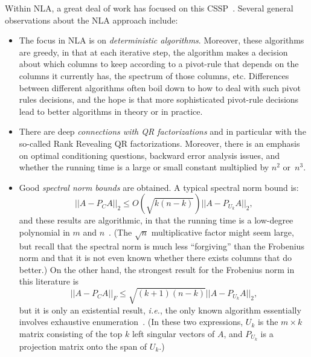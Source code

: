 \documentclass[twoside]{article}
\begin{document}
Within NLA, a great deal of work has focused on this 
CSSP~\cite{BG65,Fos86,Cha87,CH90,BH91,HP92,CI94,GE96,BQ98a,PT99,Pan00}.
Several general observations about the NLA approach include:
\begin{itemize}
\item
The focus in NLA is on \emph{deterministic algorithms}.
Moreover, these algorithms are greedy, in that at each iterative step, the 
algorithm makes a decision about which columns to keep according to a 
pivot-rule that depends on the columns it currently has, the spectrum of 
those columns, etc.
Differences between different algorithms often boil down to how to deal with 
such pivot rules decisions, and the hope is that more sophisticated 
pivot-rule decisions lead to better algorithms in theory or in practice.
\item
There are deep \emph{connections with QR factorizations} and in particular 
with the so-called Rank Revealing QR factorizations.
Moreover, there is an emphasis on optimal conditioning questions, backward 
error analysis issues, and whether the running time is a large or small 
constant multiplied by $n^2$ or~$n^3$.
\item
Good \emph{spectral norm bounds} are obtained.
A typical spectral norm bound is:
\begin{equation}
||A-P_CA||_2 \le O\left(\sqrt{k(n-k)}\right)||A-P_{U_k}A||_2 ,
\label{eqn:cssp-1}
\end{equation}
and these results are algorithmic, in that the running time is a low-degree 
polynomial in $m$ and $n$~\cite{GE96}.
(The $\sqrt{n}$ multiplicative factor might seem large, but recall that 
the spectral norm is much less ``forgiving'' than the Frobenius norm and 
that it is not even known whether there exists columns that do better.)
On the other hand, the strongest result for the Frobenius norm in this 
literature is
\begin{equation}
||A-P_CA||_F \le \sqrt{(k+1)(n-k)}||A-P_{U_k}A||_2  ,
\label{eqn:cssp-2}
\end{equation}
but it is only an existential result, \emph{i.e.}, the only known algorithm 
essentially involves exhaustive enumeration~\cite{HP92}.
(In these two expressions, $U_k$ is the $m \times k$ matrix consisting of the
top $k$ left singular vectors of $A$, and $P_{U_k}$ is a projection matrix 
onto the span of $U_k$.)
\end{itemize}
\end{document}
